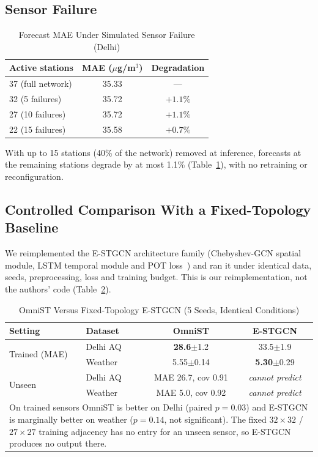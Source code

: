 \documentclass[journal]{IEEEtran}
\begin{document}
\subsection{Sensor Failure}

\begin{table}[htbp]
\caption{Forecast MAE Under Simulated Sensor Failure (Delhi)}
\centering
\begin{tabular}{lcc}
\toprule
\textbf{Active stations} & \textbf{MAE ($\mu$g/m$^3$)} & \textbf{Degradation} \\
\midrule
37 (full network) & 35.33 & --- \\
32 (5 failures) & 35.72 & $+1.1\%$ \\
27 (10 failures) & 35.72 & $+1.1\%$ \\
22 (15 failures) & 35.58 & $+0.7\%$ \\
\bottomrule
\end{tabular}
\label{tab:resilience}
\end{table}

With up to 15 stations (40\% of the network) removed at inference, forecasts at the remaining
stations degrade by at most 1.1\% (Table~\ref{tab:resilience}), with no retraining or
reconfiguration.

\subsection{Controlled Comparison With a Fixed-Topology Baseline}
\label{sec:controlled}

We reimplemented the E-STGCN architecture family (Chebyshev-GCN spatial module, LSTM temporal module
and POT loss~\cite{panja2026estgcn}) and ran it under identical data, seeds, preprocessing, loss and
training budget. This is our reimplementation, not the authors' code (Table~\ref{tab:controlled}).

\begin{table}[htbp]
\caption{OmniST Versus Fixed-Topology E-STGCN (5 Seeds, Identical Conditions)}
\centering
\footnotesize
\setlength{\tabcolsep}{3.5pt}
\begin{tabular}{llcc}
\toprule
\textbf{Setting} & \textbf{Dataset} & \textbf{OmniST} & \textbf{E-STGCN} \\
\midrule
\multirow{2}{*}{Trained (MAE)} & Delhi AQ & \textbf{28.6}$\pm$1.2 & 33.5$\pm$1.9 \\
                               & Weather  & 5.55$\pm$0.14 & \textbf{5.30}$\pm$0.29 \\
\midrule
\multirow{2}{*}{Unseen} & Delhi AQ & MAE 26.7, cov 0.91 & \emph{cannot predict} \\
                                & Weather  & MAE 5.0, cov 0.92 & \emph{cannot predict} \\
\bottomrule
\multicolumn{4}{p{0.95\columnwidth}}{\footnotesize On trained sensors OmniST is better on Delhi
(paired $p{=}0.03$) and E-STGCN is marginally better on weather ($p{=}0.14$, not significant). The
fixed $32{\times}32$ / $27{\times}27$ training adjacency has no entry for an unseen sensor, so
E-STGCN produces no output there.} \\
\end{tabular}
\label{tab:controlled}
\end{table}
\end{document}
